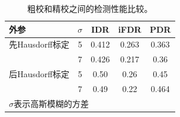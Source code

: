 \documentclass[lang=cn,11pt]{elegantpaper}
\begin{document}
\begin{table}[htbp]%
  \small
  \centering
  \caption{粗校和精校之间的检测性能比较。  }
  \label{tab:5}
  
    \begin{tabular}{l|c|ccc}
    \toprule
           外参    &   $\sigma$  &   IDR & iFDR & PDR     \\
    \midrule%
    先Hausdorff标定   &    5     &   0.412 &  0.263 & 0.363   \\
        &   7     &   0.426 &  0.217 & 0.36   \\
    后Hausdorff标定    &  5 & 0.50 & 0.26 &  0.45 \\
        &  7 & 0.49 & 0.22 & 0.464 \\
    
    \bottomrule%
    \multicolumn{5}{l}{\scriptsize $\sigma$表示高斯模糊的方差} \\
    \end{tabular}%
\end{table}%



%
% 
\end{document}
